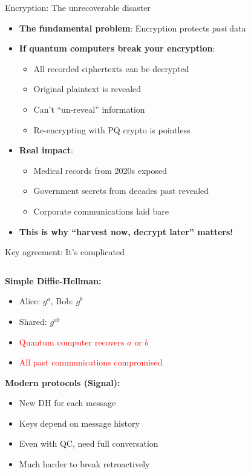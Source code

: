 \documentclass[aspectratio=169, lualatex, handout]{beamer}
\begin{document}
\begin{frame}{Encryption: The unrecoverable disaster}
	\begin{itemize}
		\item \textbf{The fundamental problem}: Encryption protects \textit{past} data
		\item \textbf{If quantum computers break your encryption}:
		      \begin{itemize}
			      \item All recorded ciphertexts can be decrypted
			      \item Original plaintext is revealed
			      \item Can't ``un-reveal'' information
			      \item Re-encrypting with PQ crypto is pointless
		      \end{itemize}
		\item \textbf{Real impact}:
		      \begin{itemize}
			      \item Medical records from 2020s exposed
			      \item Government secrets from decades past revealed
			      \item Corporate communications laid bare
		      \end{itemize}
		\item \textbf{This is why ``harvest now, decrypt later'' matters!}
	\end{itemize}
\end{frame}

\begin{frame}{Key agreement: It's complicated}
	\begin{columns}[c]
		\begin{column}{1\textwidth}
			\textbf{Simple Diffie-Hellman:}
			\begin{itemize}
				\item Alice: $g^a$, Bob: $g^b$
				\item Shared: $g^{ab}$
				\item \textcolor{red}{Quantum computer recovers $a$ or $b$}
				\item \textcolor{red}{All past communications compromised}
			\end{itemize}

			\textbf{Modern protocols (Signal):}
			\begin{itemize}
				\item New DH for each message
				\item Keys depend on message history
				\item Even with QC, need full conversation
				\item \textcolor{green!70!black}{Much harder to break retroactively}
			\end{itemize}
		\end{column}
	\end{columns}
\end{frame}
\end{document}
